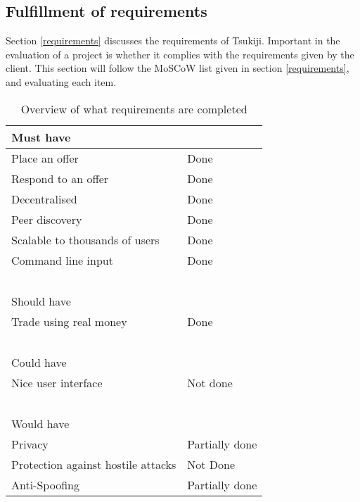 \subsection{Fulfillment of requirements}
\label{requirementsfill}
Section \ref{requirements} discusses the requirements of Tsukiji.
Important in the evaluation of a project is whether it complies with the requirements given by the client.
This section will follow the MoSCoW list given in section \ref{requirements}, and evaluating each item.
\begin{table}[H]
\centering
    \begin{tabular}{|l|l|}
    \hline
    Must have                          & ~              \\ \hline
    Place an offer                     & Done           \\
    Respond to an offer                & Done           \\
    Decentralised                      & Done           \\
    Peer discovery                     & Done           \\
    Scalable to thousands of users     & Done           \\
    Command line input                 & Done           \\
    ~                                  & ~              \\ \hline
    Should have                        & ~              \\ \hline
    Trade using real money             & Done           \\
    ~                                  & ~              \\ \hline
    Could have                         & ~              \\ \hline
    Nice user interface                & Not done       \\
    ~                                  & ~              \\ \hline
    Would have                         & ~              \\ \hline
    Privacy                            & Partially done \\
    Protection against hostile attacks & Not Done       \\
    Anti-Spoofing                      & Partially done \\ \hline
    \end{tabular}
    \caption {Overview of what requirements are completed}
\end{table}

